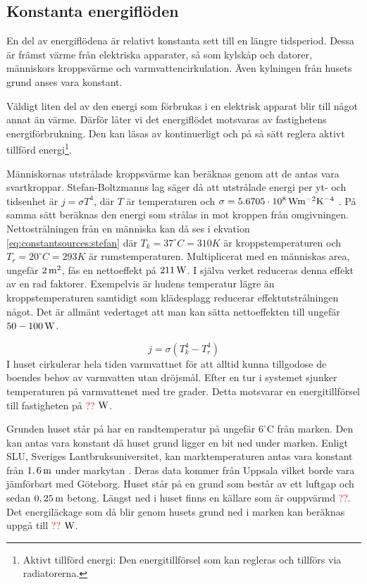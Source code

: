 \subsection{Konstanta energiflöden}

En del av energiflödena är relativt konstanta sett till en längre tidsperiod. Dessa är främst värme från elektriska apparater, så som kylskåp och datorer, människors kroppsvärme och varmvattencirkulation. Även kylningen från husets grund anses vara konstant.

Väldigt liten del av den energi som förbrukas i en elektrisk apparat blir till något annat än värme. Därför låter vi det energiflödet motsvaras av fastighetens energiförbrukning. Den kan läsas av kontinuerligt och på så sätt reglera aktivt tillförd energi\footnote{Aktivt tillförd energi: Den energitillförsel som kan regleras och tillförs via radiatorerna.}.

Människornas utstrålade kroppsvärme kan beräknas genom att de antas vara svartkroppar. Stefan-Boltzmanns lag säger då att utstrålade energi per yt- och tidsenhet är $j=\sigma T^4$, där $T$ är temperaturen och $\sigma=\unit[5.6705\cdot 10^8]{Wm^{-2}K^{-4}}$ \cite{physicshandbook}. På samma sätt beräknas den energi som strålas in mot kroppen från omgivningen. Nettostrålningen från en människa kan då ses i ekvation \eqref{eq:constantsources:stefan} där $T_k=37^{\circ}C=310K$ är kroppstemperaturen och $T_r=20^{\circ}C=293K$ är rumstemperaturen. Multiplicerat med en människas area, ungefär $\unit[2]{m^2}$, fås en nettoeffekt på $\unit[211]{W}$. I själva verket reduceras denna effekt av en rad faktorer. Exempelvis är hudens temperatur lägre än kroppstemperaturen samtidigt som klädesplagg reducerar effektutstrålningen något. Det är allmänt vedertaget att man kan sätta nettoeffekten till ungefär $\unit[50-100]{W}$.

\begin{equation}
\label{eq:constantsources:stefan}
j=\sigma \left( T_k^4 - T_r^4 \right)
\end{equation}
\noindent
I huset cirkulerar hela tiden varmvattnet för att alltid kunna tillgodose de boendes behov av varmvatten utan dröjsmål. Efter en tur i systemet sjunker temperaturen på varmvattenet med tre grader. Detta motsvarar en energitillförsel till fastigheten på \textcolor{red}{??} $\unit[]{W}$.

Grunden huset står på har en randtemperatur på ungefär $6^{\circ}\mbox{C}$ från marken. Den kan antas vara konstant då huset grund ligger en bit ned under marken. Enligt SLU, Sveriges Lantbruksuniversitet, kan marktemperaturen antas vara konstant från $\unit[1,6]{m}$ under markytan \cite{SLU}. Deras data kommer från Uppsala vilket borde vara jämförbart med Göteborg. Huset står på en grund som består av ett luftgap och sedan $\unit[0,25]{m}$ betong. Längst ned i huset finns en källare som är ouppvärmd \textcolor{red}{??}. Det energiläckage som då blir genom husets grund ned i marken kan beräknas uppgå till \textcolor{red}{??} $\unit[]{W}$.
